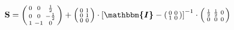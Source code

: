 \documentclass[10pt]{article} \usepackage{amsmath} \usepackage{bbold}
\begin{document}
\[ \mathbf{S} = \left(\begin{smallmatrix} 0 & 0 & \frac{1}{2} \\ 0 & 0
& -\frac{1}{2} \\ 1 & -1 & 0 \end{smallmatrix}\right) +
\left(\begin{smallmatrix} 0 & 1 \\ 0 & 1 \\ 0 & 0
\end{smallmatrix}\right) \cdot \left[ \boldsymbol{\mathbbm{I}}  -
\left(\begin{smallmatrix} 0 & 0 \\ 1 & 0 \end{smallmatrix}\right)
\right]^{-1} \cdot\left(\begin{smallmatrix} \frac{1}{2} & \frac{1}{2}
& 0 \\ 0 & 0 & 0 \end{smallmatrix}\right) \]
\end{document}
